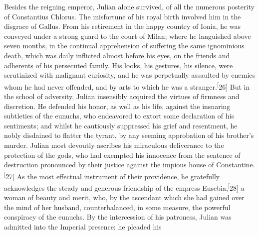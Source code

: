 


Besides the reigning emperor, Julian alone survived, of all the
numerous posterity of Constantius Chlorus. The misfortune of his
royal birth involved him in the disgrace of Gallus. From his
retirement in the happy country of Ionia, he was conveyed under a
strong guard to the court of Milan; where he languished above
seven months, in the continual apprehension of suffering the same
ignominious death, which was daily inflicted almost before his
eyes, on the friends and adherents of his persecuted family. His
looks, his gestures, his silence, were scrutinized with malignant
curiosity, and he was perpetually assaulted by enemies whom he
had never offended, and by arts to which he was a stranger.\textsuperscript[26]
But in the school of adversity, Julian insensibly acquired the
virtues of firmness and discretion. He defended his honor, as
well as his life, against the insnaring subtleties of the
eunuchs, who endeavored to extort some declaration of his
sentiments; and whilst he cautiously suppressed his grief and
resentment, he nobly disdained to flatter the tyrant, by any
seeming approbation of his brother’s murder. Julian most devoutly
ascribes his miraculous deliverance to the protection of the
gods, who had exempted his innocence from the sentence of
destruction pronounced by their justice against the impious house
of Constantine.\textsuperscript[27] As the most effectual instrument of their
providence, he gratefully acknowledges the steady and generous
friendship of the empress Eusebia,\textsuperscript[28] a woman of beauty and
merit, who, by the ascendant which she had gained over the mind
of her husband, counterbalanced, in some measure, the powerful
conspiracy of the eunuchs. By the intercession of his patroness,
Julian was admitted into the Imperial presence: he pleaded his
